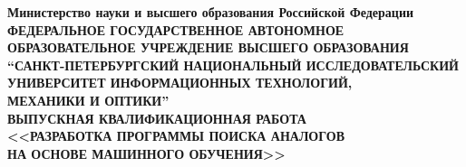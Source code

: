 
\thispagestyle{empty}

\begin{center}
  {
    \bfseries
    {
      \subnormal
      Министерство науки и высшего образования Российской Федерации
    } \\[-0.5em]
    {
      \scriptsize
      ФЕДЕРАЛЬНОЕ ГОСУДАРСТВЕННОЕ АВТОНОМНОЕ ОБРАЗОВАТЕЛЬНОЕ УЧРЕЖДЕНИЕ ВЫСШЕГО ОБРАЗОВАНИЯ
    } \\[-0.25em]
    {
      \subnormal
      “САНКТ-ПЕТЕРБУРГСКИЙ НАЦИОНАЛЬНЫЙ ИССЛЕДОВАТЕЛЬСКИЙ \\[-0.5em]
      УНИВЕРСИТЕТ ИНФОРМАЦИОННЫХ ТЕХНОЛОГИЙ, \\[-0.75em]
      МЕХАНИКИ И ОПТИКИ”
    } \\[3.25em]
    {
      \normalsize
      ВЫПУСКНАЯ КВАЛИФИКАЦИОННАЯ РАБОТА
    } \\[3.75em]
    {
      \normalsize
      <<РАЗРАБОТКА ПРОГРАММЫ ПОИСКА АНАЛОГОВ\\[-0.5em]
      НА ОСНОВЕ МАШИННОГО ОБУЧЕНИЯ>>
    } \\[5.75em]
  }
\end{center}

